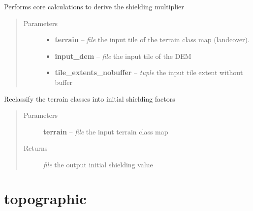\documentclass[letterpaper,10pt,english]{sphinxmanual}
\begin{document}
\begin{fulllineitems}
\label{docs/shielding:shield_mult.shield}
Performs core calculations to derive the shielding multiplier
\begin{quote}\begin{description}
\item[{Parameters}] \leavevmode\begin{itemize}
\item {} 
\textbf{terrain} -- \emph{file} the input tile of the terrain class map (landcover).

\item {} 
\textbf{input\_dem} -- \emph{file} the input tile of the DEM

\item {} 
\textbf{tile\_extents\_nobuffer} -- \emph{tuple} the input tile extent without buffer

\end{itemize}

\end{description}\end{quote}

\end{fulllineitems}



\begin{fulllineitems}
\label{docs/shielding:shield_mult.terrain_class2ms_orig}
Reclassify the terrain classes into initial shielding factors
\begin{quote}\begin{description}
\item[{Parameters}] \leavevmode
\textbf{terrain} -- \emph{file} the input terrain class map

\item[{Returns}] \leavevmode
\emph{file} the output initial shielding value

\end{description}\end{quote}

\end{fulllineitems}



\section{topographic}
\label{docs/topographic:topographic}\label{docs/topographic::doc}
\end{document}
